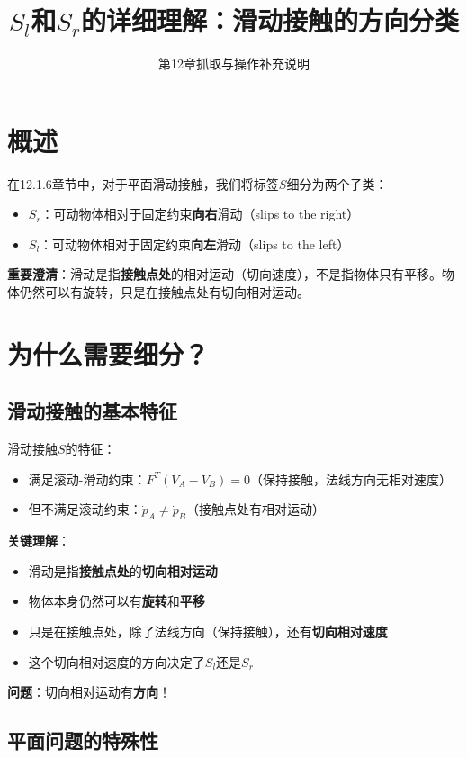 \documentclass[12pt,a4paper]{article}
\title{$S_l$和$S_r$的详细理解：滑动接触的方向分类}
\author{第12章抓取与操作补充说明}
\date{}
\begin{document}
\maketitle

\section{概述}

在12.1.6章节中，对于平面滑动接触，我们将标签$S$细分为两个子类：
\begin{itemize}
\item \textbf{$S_r$}：可动物体相对于固定约束\textbf{向右}滑动（slips to the right）
\item \textbf{$S_l$}：可动物体相对于固定约束\textbf{向左}滑动（slips to the left）
\end{itemize}

\textbf{重要澄清}：滑动是指\textbf{接触点处}的相对运动（切向速度），不是指物体只有平移。物体仍然可以有旋转，只是在接触点处有切向相对运动。

\section{为什么需要细分？}

\subsection{滑动接触的基本特征}

滑动接触$S$的特征：
\begin{itemize}
\item 满足滚动-滑动约束：$F^T (V_A - V_B) = 0$（保持接触，法线方向无相对速度）
\item 但不满足滚动约束：$\dot{p}_A \neq \dot{p}_B$（接触点处有相对运动）
\end{itemize}

\textbf{关键理解}：
\begin{itemize}
\item 滑动是指\textbf{接触点处}的\textbf{切向相对运动}
\item 物体本身仍然可以有\textbf{旋转}和\textbf{平移}
\item 只是在接触点处，除了法线方向（保持接触），还有\textbf{切向相对速度}
\item 这个切向相对速度的方向决定了$S_l$还是$S_r$
\end{itemize}

\textbf{问题}：切向相对运动有\textbf{方向}！

\subsection{平面问题的特殊性}
\end{document}
